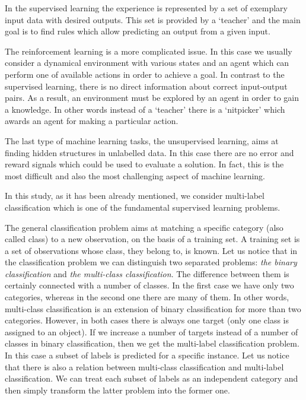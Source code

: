 \documentclass[english,a4paper,twoside]{ppfcmthesis}
\begin{document}
In the supervised learning the experience is represented by a set of exemplary input data with desired outputs. This set is provided by a `teacher' and the main goal is to find rules which allow predicting an output from a given input.

The reinforcement learning is a more complicated issue. In this case we usually consider a dynamical environment with various states and an agent which can perform one of available actions in order to achieve a goal. In contrast to the supervised learning, there is no direct information about correct input-output pairs. As a result, an environment must be explored by an agent in order to gain a knowledge. In other words instead of a `teacher' there is a `nitpicker' which awards an agent for making a particular action. 

The last type of machine learning tasks, the unsupervised learning, aims at finding hidden structures in unlabelled data. In this case there are no error and reward signals which could be used to evaluate a solution. In fact, this is the most difficult and also the most challenging aspect of machine learning. 

In this study, as it has been already mentioned, we consider multi-label classification which is one of the fundamental supervised learning problems. 

The general classification problem aims at matching a specific category (also called class) to a new observation, on the basis of a training set. A training set is a set of observations whose class, they belong to, is known. Let us notice that in the classification problem we can distinguish two separated problems: \textit{the binary classification} and \textit{the multi-class classification}. The difference between them is certainly connected with a number of classes. In the first case we have only two categories, whereas in the second one there are many of them. In other words, multi-class classification is an extension of binary classification for more than two categories. However, in both cases there is always one target (only one class is assigned to an object). If we increase a number of targets instead of a number of classes in binary classification, then we get the multi-label classification problem. In this case a subset of labels is predicted for a specific instance. Let us notice that there is also a relation between multi-class classification and multi-label classification. We can treat each subset of labels as an independent category and then simply transform the latter problem into the former one. 
\end{document}

